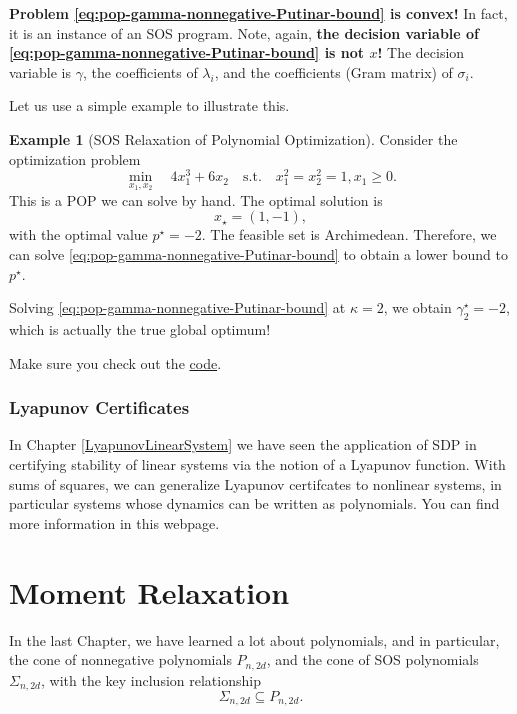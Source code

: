 \documentclass[
]{book}
\theoremstyle{definition}
\theoremstyle{definition}
\newtheorem{example}{Example}[chapter]
\theoremstyle{definition}
\theoremstyle{definition}
\theoremstyle{remark}
\begin{document}
\textbf{Problem \eqref{eq:pop-gamma-nonnegative-Putinar-bound} is convex!} In fact, it is an instance of an SOS program. Note, again, \textbf{the decision variable of \eqref{eq:pop-gamma-nonnegative-Putinar-bound} is not \(x\)!} The decision variable is \(\gamma\), the coefficients of \(\lambda_i\), and the coefficients (Gram matrix) of \(\sigma_i\).

Let us use a simple example to illustrate this.

\begin{example}[SOS Relaxation of Polynomial Optimization]
\protect\hypertarget{exm:SOSRelaxation}{}\label{exm:SOSRelaxation}Consider the optimization problem
\[
\min_{x_1,x_2} \quad 4 x_1^3 + 6 x_2  \quad \mathrm{s.t.}\quad x_1^2 = x_2^2 = 1, x_1 \geq 0.
\]
This is a POP we can solve by hand. The optimal solution is
\[
x_\star = (1,-1),
\]
with the optimal value \(p^\star = -2\).
The feasible set is Archimedean. Therefore, we can solve \eqref{eq:pop-gamma-nonnegative-Putinar-bound} to obtain a lower bound to \(p^\star\).

Solving \eqref{eq:pop-gamma-nonnegative-Putinar-bound} at \(\kappa=2\), we obtain \(\gamma_{2}^\star = -2\), which is actually the true global optimum!

Make sure you check out the \href{https://github.com/ComputationalRobotics/Semidefinite-Examples/blob/main/example_pop.m}{code}.
\end{example}

\subsection{Lyapunov Certificates}\label{lyapunov-certificates}

In Chapter \ref{LyapunovLinearSystem} we have seen the application of SDP in certifying stability of linear systems via the notion of a Lyapunov function. With sums of squares, we can generalize Lyapunov certifcates to nonlinear systems, in particular systems whose dynamics can be written as polynomials. You can find more information in this webpage.

\chapter{Moment Relaxation}\label{Moment}

In the last Chapter, we have learned a lot about polynomials, and in particular, the cone of nonnegative polynomials \(P_{n,2d}\), and the cone of SOS polynomials \(\Sigma_{n,2d}\), with the key inclusion relationship
\[
\Sigma_{n,2d} \subseteq P_{n,2d}.
\]
\end{document}
